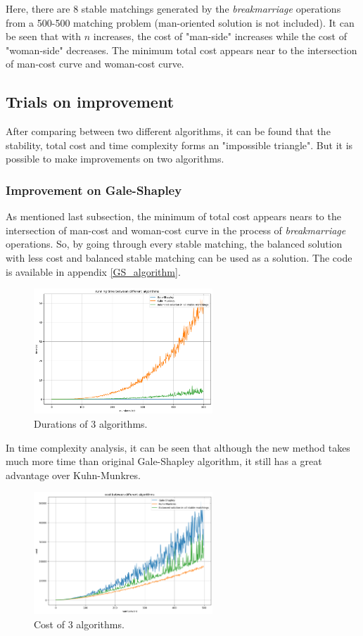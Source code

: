 \documentclass[14pt]{extarticle}
\begin{document}
Here, there are 8 stable matchings generated by the {\it breakmarriage} operations from a 500-500 matching problem (man-oriented solution is not included).
It can be seen that with $n$ increases, the cost of "man-side" increases while the cost of "woman-side" decreases.
The minimum total cost appears near to the intersection of man-cost curve and woman-cost curve.

\subsection{Trials on improvement} 

After comparing between two different algorithms, it can be found that the stability, total cost and time complexity forms an "impossible triangle".
But it is possible to make improvements on two algorithms.

\subsubsection{Improvement on Gale-Shapley}

As mentioned last subsection, the minimum of total cost appears nears to the intersection of man-cost and woman-cost curve in the process of {\it breakmarriage} operations. 
So, by going through every stable matching, the balanced solution with less cost and balanced stable matching can be used as a solution.
The code is available in appendix \ref{GS_algorithm}.

\begin{figure}[H]
  \centering
  \includegraphics[width=0.6\textwidth]{running time all.png}
  \caption{Durations of 3 algorithms.}
\end{figure}

In time complexity analysis, it can be seen that although the new method takes much more time than original Gale-Shapley algorithm, it still has a great advantage over Kuhn-Munkres.

\begin{figure}[H]
  \centering
  \includegraphics[width=0.6\textwidth]{cost all.png}
  \caption{Cost of 3 algorithms.}
\end{figure}
\end{document}
